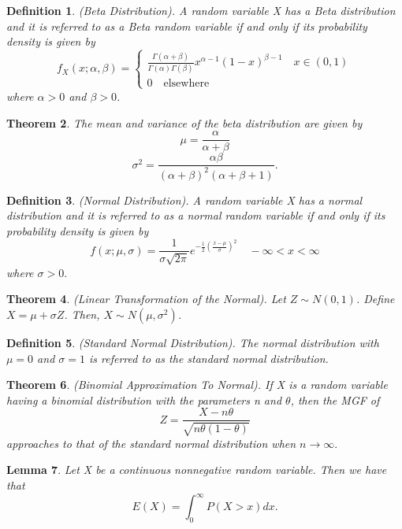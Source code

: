 \documentclass[twoside]{article}
\newcounter{lecnum}
\newtheorem{theorem}{Theorem}[lecnum]
\newtheorem{lemma}[theorem]{Lemma}
\newtheorem{definition}[theorem]{Definition}
\begin{document}
\begin{definition}(Beta Distribution). A random variable X has a Beta distribution and it is referred to as a Beta random variable if and only if its probability density is given by 
$$
f_X(x; \alpha, \beta) = \begin{cases}
\frac{\Gamma(\alpha + \beta)}{\Gamma(\alpha)\Gamma(\beta)}x^{\alpha - 1}(1 - x)^{\beta - 1} \quad x \in (0,1) \\
0 \quad \text{elsewhere}
\end{cases}
$$
where $\alpha > 0$ and $\beta > 0$.
\end{definition}

\begin{theorem}The mean and variance of the beta distribution are given by 
$$
\mu = \frac{\alpha}{\alpha + \beta}
$$
$$
\sigma^2 = \frac{\alpha \beta}{(\alpha + \beta)^2(\alpha + \beta + 1)}.
$$
\end{theorem}

\begin{definition}(Normal Distribution). A random variable X has a normal distribution and it is referred to as a normal random variable if and only if its probability density is given by 
$$
f(x; \mu, \sigma) = \frac{1}{\sigma \sqrt{2 \pi}}e^{-\frac{1}{2}(\frac{x - \mu}{\sigma})^2} \quad -\infty < x < \infty
$$
where $\sigma > 0.$
\end{definition}

\begin{theorem}(Linear Transformation of the Normal). Let $Z \sim N(0,1)$. Define $X = \mu + \sigma Z$. Then, $X \sim N(\mu, \sigma^2)$.
\end{theorem}

\begin{definition}(Standard Normal Distribution). The normal distribution with $\mu = 0$ and $\sigma = 1$ is referred to as the standard normal distribution.
\end{definition}


\begin{theorem}(Binomial Approximation To Normal). If X is a random variable having a binomial distribution with the parameters n and $\theta$, then the MGF of 
$$
Z = \frac{X - n\theta}{\sqrt{n\theta(1 - \theta)}}
$$
approaches to that of the standard normal distribution when $n \rightarrow \infty.$
\end{theorem}

\begin{lemma} Let X be a continuous nonnegative random variable. Then we have that 
$$
E(X) = \int_{0}^{\infty}P(X > x)dx.
$$
\end{lemma}
\end{document}
